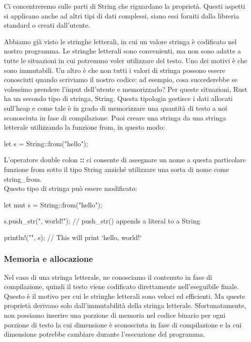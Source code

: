 \documentclass[11pt,a4paper]{article}
\begin{document}
{Ci concentreremo sulle parti di String che riguardano la proprietà. Questi aspetti si applicano anche ad altri tipi di dati complessi, siano essi forniti dalla libreria standard o creati dall'utente.

Abbiamo già visto le stringhe letterali, in cui un valore stringa è codificato nel nostro programma. Le stringhe letterali sono convenienti, ma non sono adatte a tutte le situazioni in cui potremmo voler utilizzare del testo. Uno dei motivi è che sono immutabili. Un altro è che non tutti i valori di stringa possono essere conosciuti quando scriviamo il nostro codice: ad esempio, cosa succederebbe se volessimo prendere l'input dell'utente e memorizzarlo? Per queste situazioni, Rust ha un secondo tipo di stringa, String. Questa tipologia gestisce i dati allocati sull'heap e come tale è in grado di memorizzare una quantità di testo a noi sconosciuta in fase di compilazione. Puoi creare una stringa da una stringa letterale utilizzando la funzione from, in questo modo:
\begin{rust}
let s = String::from("hello");
\end{rust}
L'operatore double colon \textbf{::} ci consente di assegnare un nome a questa particolare funzione from sotto il tipo String anziché utilizzare una sorta di nome come string\_from.\\

Questo tipo di stringa può essere modificato:

\begin{rust}
    let mut s = String::from("hello");

    s.push_str(", world!"); // push_str() appends a literal to a String

    println!("{}", s); // This will print `hello, world!`
\end{rust}

\subsubsection{Memoria e allocazione}

Nel caso di una stringa letterale, ne conosciamo il contenuto in fase di compilazione, quindi il testo viene codificato direttamente nell'eseguibile finale. Questo è il motivo per cui le stringhe letterali sono veloci ed efficienti. Ma queste proprietà derivano solo dall’immutabilità della stringa letterale. Sfortunatamente, non possiamo inserire una porzione di memoria nel codice binario per ogni porzione di testo la cui dimensione è sconosciuta in fase di compilazione e la cui dimensione potrebbe cambiare durante l'esecuzione del programma.

}
\end{document}
